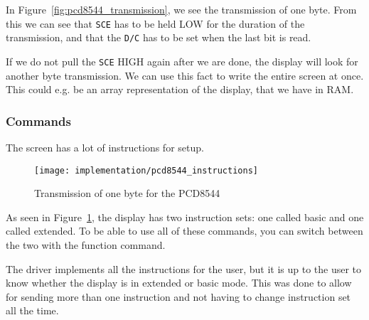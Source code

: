 In Figure~\ref{fig:pcd8544_transmission}, we see the transmission of one byte.
From this we can see that \texttt{SCE} has to be held LOW for the duration of the transmission, and that the \texttt{D/C} has to be set when the last bit is read.

If we do not pull the \texttt{SCE} HIGH again after we are done, the display will look for another byte transmission. We can use this fact to write the entire screen at once. This could e.g. be an array representation of the display, that we have in RAM.

\subsubsection{Commands}

The screen has a lot of instructions for setup.

\begin{figure}
	\centering
	\texttt{[image: implementation/pcd8544\_instructions]}
	\caption{Transmission of one byte for the PCD8544\cite[p. 12]{philips:pcd8544}}
	\label{fig:pcd8544_Instructions}
\end{figure}

As seen in Figure~\ref{fig:pcd8544_Instructions}, the display has two instruction sets: one called basic and one called extended. To be able to use all of these commands, you can switch between the two with the function command.

The driver implements all the instructions for the user, but it is up to the user to know whether the display is in extended or basic mode. This was done to allow for sending more than one instruction and not having to change instruction set all the time.
